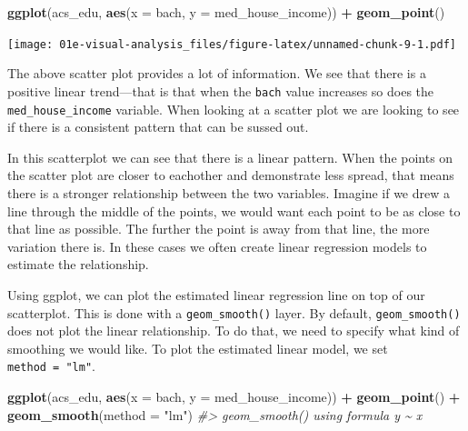 \documentclass[
]{book}
\newenvironment{Shaded}{\begin{snugshade}}{\end{snugshade}}
\newcommand{\CommentTok}[1]{\textcolor[rgb]{0.56,0.35,0.01}{\textit{#1}}}
\newcommand{\DataTypeTok}[1]{\textcolor[rgb]{0.13,0.29,0.53}{#1}}
\newcommand{\KeywordTok}[1]{\textcolor[rgb]{0.13,0.29,0.53}{\textbf{#1}}}
\newcommand{\NormalTok}[1]{#1}
\newcommand{\OperatorTok}[1]{\textcolor[rgb]{0.81,0.36,0.00}{\textbf{#1}}}
\newcommand{\StringTok}[1]{\textcolor[rgb]{0.31,0.60,0.02}{#1}}
\begin{document}
\begin{Shaded}
\begin{Highlighting}[]
\KeywordTok{ggplot}\NormalTok{(acs\_edu, }\KeywordTok{aes}\NormalTok{(}\DataTypeTok{x =}\NormalTok{ bach, }\DataTypeTok{y =}\NormalTok{ med\_house\_income)) }\OperatorTok{+}
\StringTok{  }\KeywordTok{geom\_point}\NormalTok{()}
\end{Highlighting}
\end{Shaded}

\texttt{[image: 01e-visual-analysis\_files/figure-latex/unnamed-chunk-9-1.pdf]}

The above scatter plot provides a lot of information. We see that there is a positive linear trend---that is that when the \texttt{bach} value increases so does the \texttt{med\_house\_income} variable. When looking at a scatter plot we are looking to see if there is a consistent pattern that can be sussed out.

In this scatterplot we can see that there is a linear pattern. When the points on the scatter plot are closer to eachother and demonstrate less spread, that means there is a stronger relationship between the two variables. Imagine if we drew a line through the middle of the points, we would want each point to be as close to that line as possible. The further the point is away from that line, the more variation there is. In these cases we often create linear regression models to estimate the relationship.

Using ggplot, we can plot the estimated linear regression line on top of our scatterplot. This is done with a \texttt{geom\_smooth()} layer. By default, \texttt{geom\_smooth()} does not plot the linear relationship. To do that, we need to specify what kind of smoothing we would like. To plot the estimated linear model, we set \texttt{method\ =\ "lm"}.

\begin{Shaded}
\begin{Highlighting}[]
\KeywordTok{ggplot}\NormalTok{(acs\_edu, }\KeywordTok{aes}\NormalTok{(}\DataTypeTok{x =}\NormalTok{ bach, }\DataTypeTok{y =}\NormalTok{ med\_house\_income)) }\OperatorTok{+}
\StringTok{  }\KeywordTok{geom\_point}\NormalTok{() }\OperatorTok{+}
\StringTok{  }\KeywordTok{geom\_smooth}\NormalTok{(}\DataTypeTok{method =} \StringTok{"lm"}\NormalTok{)}
\CommentTok{\#\textgreater{} \textasciigrave{}geom\_smooth()\textasciigrave{} using formula \textquotesingle{}y \textasciitilde{} x\textquotesingle{}}
\end{Highlighting}
\end{Shaded}
\end{document}
